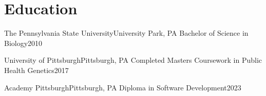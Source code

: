 
\section{Education}
\resumeSubHeadingListStart
  \resumeSubheading
    {The Pennsylvania State University}{University Park, PA}
    {Bachelor of Science in Biology}{2010}

  \resumeSubheading
    {University of Pittsburgh}{Pittsburgh, PA}
    {Completed Masters Coursework in Public Health Genetics}{2017}

  \resumeSubheading
    {Academy Pittsburgh}{Pittsburgh, PA}
    {Diploma in Software Development}{2023}
\resumeSubHeadingListEnd